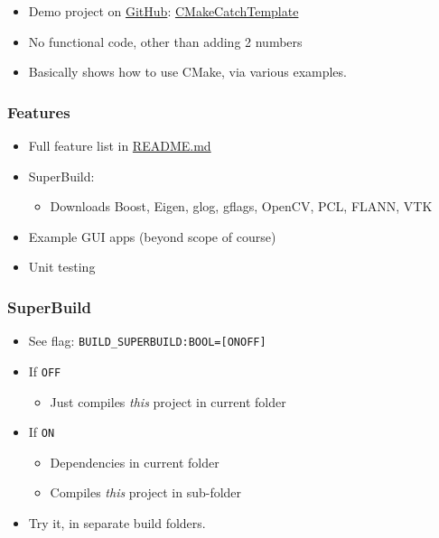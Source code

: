 \begin{itemize}
\itemsep1pt\parskip0pt
\item
  Demo project on \href{https://github.com}{GitHub}:
  \href{https://github.com/MattClarkson/CMakeCatchTemplate}{CMakeCatchTemplate}
\item
  No functional code, other than adding 2 numbers
\item
  Basically shows how to use CMake, via various examples.
\end{itemize}

\subsubsection{Features}\label{features}

\begin{itemize}
\itemsep1pt\parskip0pt
\item
  Full feature list in
  \href{https://github.com/MattClarkson/CMakeCatchTemplate/blob/master/README.md}{README.md}
\item
  SuperBuild:

  \begin{itemize}
  \itemsep1pt\parskip0pt
  \item
    Downloads Boost, Eigen, glog, gflags, OpenCV, PCL, FLANN, VTK
  \end{itemize}
\item
  Example GUI apps (beyond scope of course)
\item
  Unit testing
\end{itemize}

\subsubsection{SuperBuild}\label{superbuild}

\begin{itemize}
\itemsep1pt\parskip0pt
\item
  See flag: \texttt{BUILD\_SUPERBUILD:BOOL={[}ON\textbar{}OFF{]}}
\item
  If \texttt{OFF}

  \begin{itemize}
  \itemsep1pt\parskip0pt
  \item
    Just compiles \emph{this} project in current folder
  \end{itemize}
\item
  If \texttt{ON}

  \begin{itemize}
  \itemsep1pt\parskip0pt
  \item
    Dependencies in current folder
  \item
    Compiles \emph{this} project in sub-folder
  \end{itemize}
\item
  Try it, in separate build folders.
\end{itemize}

